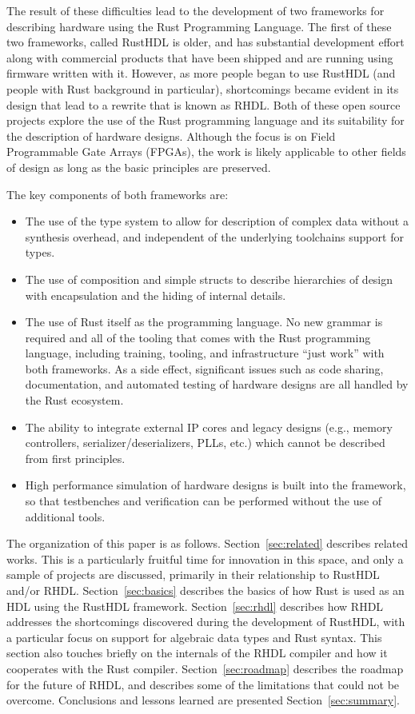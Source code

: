 \documentclass[conference]{IEEEtran}
\begin{document}
The result of these difficulties lead to the development of two frameworks for describing
hardware using the Rust Programming Language.  The first of these two frameworks, called
RustHDL is older, and has substantial development effort along with commercial products
that have been shipped and are running using firmware written with it.  However, as more
people began to use RustHDL (and people with Rust background in particular), shortcomings
became evident in its design that lead to a rewrite that is known as RHDL.  Both of
these open source projects explore the use of the Rust programming language and its
suitability for the description of hardware designs.  Although the focus is on Field Programmable
Gate Arrays (FPGAs), the work is likely applicable to other fields of design as long as
the basic principles are preserved.

The key components of both frameworks are:
\begin{itemize}
\item The use of the type system to allow for description of complex data without
  a synthesis overhead, and independent of the underlying toolchains support for
  types.
\item The use of composition and simple structs to describe hierarchies of design
  with encapsulation and the hiding of internal details.
\item The use of Rust itself as the programming language.  No new grammar is required
  and all of the tooling that comes with the Rust programming language, including training,
  tooling, and infrastructure ``just work'' with both frameworks.  As a side effect,
  significant issues such as code sharing, documentation, and automated testing of hardware designs 
  are all handled by the Rust ecosystem.
\item The ability to integrate external IP cores and legacy designs (e.g., memory controllers,
  serializer/deserializers, PLLs, etc.) which cannot be described from first principles.
\item High performance simulation of hardware designs is built into the framework, so that
  testbenches and verification can be performed without the use of additional tools.
\end{itemize}

The organization of this paper is as follows.  Section~\ref{sec:related} describes related
works.  This is a particularly fruitful time for innovation in this space, and only a
sample of projects are discussed, primarily in their relationship to RustHDL and/or RHDL.
Section~\ref{sec:basics} describes the basics of how Rust is used as an HDL using the RustHDL
framework.  Section~\ref{sec:rhdl} describes how RHDL addresses the shortcomings discovered
during the development of RustHDL, with a particular focus on support for algebraic data types
and Rust syntax.  This section also touches briefly on the internals of the RHDL compiler and
how it cooperates with the Rust compiler.  Section~\ref{sec:roadmap} describes the roadmap for
the future of RHDL, and describes some of the limitations that could not be overcome.  Conclusions
and lessons learned are presented Section~\ref{sec:summary}.
\end{document}
